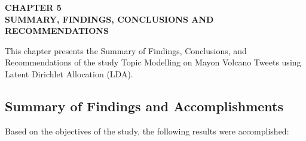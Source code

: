 \clearpage
\thispagestyle{empty}


\begin{center}
	\textbf{{CHAPTER 5}}\\
	\vspace{-1ex}
	\textbf{SUMMARY, FINDINGS, CONCLUSIONS AND RECOMMENDATIONS}
	\vspace{-2ex}
\end{center}

This chapter presents the Summary of Findings, Conclusions, and Recommendations of the study Topic Modelling on Mayon Volcano Tweets using Latent Dirichlet Allocation (LDA).

\subsection{Summary of Findings and Accomplishments}
\vspace{-2ex}Based on the objectives of the study, the following results were accomplished:


